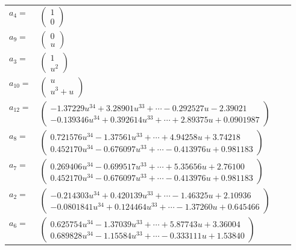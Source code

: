 \documentclass[1p]{elsarticle_modified}
\theoremstyle{definition}
\begin{document}
\begin{tabular}{m{7pt} m{180pt} m{7pt} m{180pt} }
\flushright $a_{4}=$&$\begin{pmatrix}1\\0\end{pmatrix}$ \\
\flushright $a_{9}=$&$\begin{pmatrix}0\\u\end{pmatrix}$ \\
\flushright $a_{3}=$&$\begin{pmatrix}1\\u^2\end{pmatrix}$ \\
\flushright $a_{10}=$&$\begin{pmatrix}u\\u^3+u\end{pmatrix}$ \\
\flushright $a_{12}=$&$\begin{pmatrix}-1.37229 u^{34}+3.28901 u^{33}+\cdots-0.292527 u-2.39021\\-0.139346 u^{34}+0.392614 u^{33}+\cdots+2.89375 u+0.0901987\end{pmatrix}$ \\
\flushright $a_{8}=$&$\begin{pmatrix}0.721576 u^{34}-1.37561 u^{33}+\cdots+4.94258 u+3.74218\\0.452170 u^{34}-0.676097 u^{33}+\cdots-0.413976 u+0.981183\end{pmatrix}$ \\
\flushright $a_{7}=$&$\begin{pmatrix}0.269406 u^{34}-0.699517 u^{33}+\cdots+5.35656 u+2.76100\\0.452170 u^{34}-0.676097 u^{33}+\cdots-0.413976 u+0.981183\end{pmatrix}$ \\
\flushright $a_{2}=$&$\begin{pmatrix}-0.214303 u^{34}+0.420139 u^{33}+\cdots-1.46325 u+2.10936\\-0.0801841 u^{34}+0.124464 u^{33}+\cdots-1.37260 u+0.645466\end{pmatrix}$ \\
\flushright $a_{6}=$&$\begin{pmatrix}0.625754 u^{34}-1.37039 u^{33}+\cdots+5.87743 u+3.36004\\0.689828 u^{34}-1.15584 u^{33}+\cdots-0.333111 u+1.53840\end{pmatrix}$ \\

\end{tabular}
\end{document}
